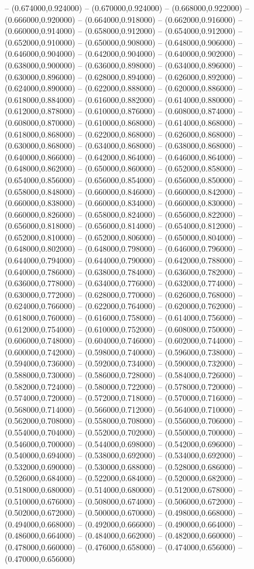 -- (0.674000,0.924000) -- (0.670000,0.924000) -- (0.668000,0.922000) -- (0.666000,0.920000) -- (0.664000,0.918000) -- (0.662000,0.916000) -- (0.660000,0.914000) -- (0.658000,0.912000) -- (0.654000,0.912000) -- (0.652000,0.910000) -- (0.650000,0.908000) -- (0.648000,0.906000) -- (0.646000,0.904000) -- (0.642000,0.904000) -- (0.640000,0.902000) -- (0.638000,0.900000) -- (0.636000,0.898000) -- (0.634000,0.896000) -- (0.630000,0.896000) -- (0.628000,0.894000) -- (0.626000,0.892000) -- (0.624000,0.890000) -- (0.622000,0.888000) -- (0.620000,0.886000) -- (0.618000,0.884000) -- (0.616000,0.882000) -- (0.614000,0.880000) -- (0.612000,0.878000) -- (0.610000,0.876000) -- (0.608000,0.874000) -- (0.608000,0.870000) -- (0.610000,0.868000) -- (0.614000,0.868000) -- (0.618000,0.868000) -- (0.622000,0.868000) -- (0.626000,0.868000) -- (0.630000,0.868000) -- (0.634000,0.868000) -- (0.638000,0.868000) -- (0.640000,0.866000) -- (0.642000,0.864000) -- (0.646000,0.864000) -- (0.648000,0.862000) -- (0.650000,0.860000) -- (0.652000,0.858000) -- (0.654000,0.856000) -- (0.656000,0.854000) -- (0.656000,0.850000) -- (0.658000,0.848000) -- (0.660000,0.846000) -- (0.660000,0.842000) -- (0.660000,0.838000) -- (0.660000,0.834000) -- (0.660000,0.830000) -- (0.660000,0.826000) -- (0.658000,0.824000) -- (0.656000,0.822000) -- (0.656000,0.818000) -- (0.656000,0.814000) -- (0.654000,0.812000) -- (0.652000,0.810000) -- (0.652000,0.806000) -- (0.650000,0.804000) -- (0.648000,0.802000) -- (0.648000,0.798000) -- (0.646000,0.796000) -- (0.644000,0.794000) -- (0.644000,0.790000) -- (0.642000,0.788000) -- (0.640000,0.786000) -- (0.638000,0.784000) -- (0.636000,0.782000) -- (0.636000,0.778000) -- (0.634000,0.776000) -- (0.632000,0.774000) -- (0.630000,0.772000) -- (0.628000,0.770000) -- (0.626000,0.768000) -- (0.624000,0.766000) -- (0.622000,0.764000) -- (0.620000,0.762000) -- (0.618000,0.760000) -- (0.616000,0.758000) -- (0.614000,0.756000) -- (0.612000,0.754000) -- (0.610000,0.752000) -- (0.608000,0.750000) -- (0.606000,0.748000) -- (0.604000,0.746000) -- (0.602000,0.744000) -- (0.600000,0.742000) -- (0.598000,0.740000) -- (0.596000,0.738000) -- (0.594000,0.736000) -- (0.592000,0.734000) -- (0.590000,0.732000) -- (0.588000,0.730000) -- (0.586000,0.728000) -- (0.584000,0.726000) -- (0.582000,0.724000) -- (0.580000,0.722000) -- (0.578000,0.720000) -- (0.574000,0.720000) -- (0.572000,0.718000) -- (0.570000,0.716000) -- (0.568000,0.714000) -- (0.566000,0.712000) -- (0.564000,0.710000) -- (0.562000,0.708000) -- (0.558000,0.708000) -- (0.556000,0.706000) -- (0.554000,0.704000) -- (0.552000,0.702000) -- (0.550000,0.700000) -- (0.546000,0.700000) -- (0.544000,0.698000) -- (0.542000,0.696000) -- (0.540000,0.694000) -- (0.538000,0.692000) -- (0.534000,0.692000) -- (0.532000,0.690000) -- (0.530000,0.688000) -- (0.528000,0.686000) -- (0.526000,0.684000) -- (0.522000,0.684000) -- (0.520000,0.682000) -- (0.518000,0.680000) -- (0.514000,0.680000) -- (0.512000,0.678000) -- (0.510000,0.676000) -- (0.508000,0.674000) -- (0.506000,0.672000) -- (0.502000,0.672000) -- (0.500000,0.670000) -- (0.498000,0.668000) -- (0.494000,0.668000) -- (0.492000,0.666000) -- (0.490000,0.664000) -- (0.486000,0.664000) -- (0.484000,0.662000) -- (0.482000,0.660000) -- (0.478000,0.660000) -- (0.476000,0.658000) -- (0.474000,0.656000) -- (0.470000,0.656000) 